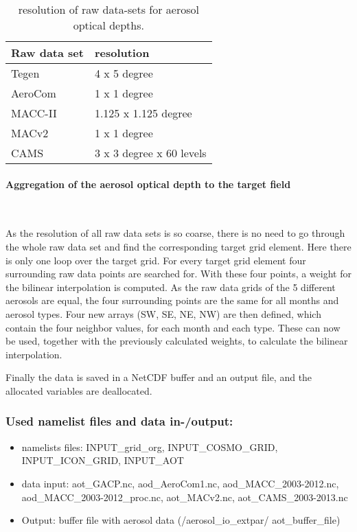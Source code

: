\documentclass[a4paper,10pt,DIV14,BCOR1cm,titlepage,twoside]{scrartcl}
\begin{document}
\begin{table}
\centering
\begin{tabular}{ll}
\textbf{Raw data set} & \textbf{resolution} \\
\hline
Tegen & 4 x 5 degree  \\
AeroCom & 1 x 1 degree  \\
MACC-II & 1.125 x 1.125 degree  \\
MACv2 & 1 x 1 degree  \\
CAMS & 3 x 3 degree x 60 levels  \\
\hline
\end{tabular}
\caption{resolution of raw data-sets for aerosol optical depths.}
\label{tab:aerosol}
\end{table}
\paragraph{Aggregation of the aerosol optical depth to the target field}\ \par\medskip\noindent
As the resolution of all raw data sets is so coarse, there is no need to go through the whole raw data set and find the corresponding target grid element. Here there is only one loop over the target grid. For every target grid element four surrounding raw data points are searched for. With these four points, a weight for the bilinear interpolation is computed. As the raw data grids of the 5 different aerosols are equal, the four surrounding points are the same for all months and aerosol types. Four new arrays (SW, SE, NE, NW) are then defined, which contain the four neighbor values, for each month and each type. These can now be used, together with the previously calculated weights, to calculate the bilinear interpolation.\par\medskip\noindent
Finally the data is saved in a NetCDF buffer and an output file, and the allocated variables are deallocated.\par\medskip\noindent
\subsubsection{Used namelist files and data in-/output:}
\begin{itemize}
\item namelists files: INPUT\_grid\_org, INPUT\_COSMO\_GRID, INPUT\_ICON\_GRID, INPUT\_AOT
 \item data input: aot\_GACP.nc, aod\_AeroCom1.nc, aod\_MACC\_2003-2012.nc, \\
     aod\_MACC\_2003-2012\_proc.nc, aot\_MACv2.nc, aot\_CAMS\_2003-2013.nc 
 \item Output: buffer file with aerosol data (/aerosol\_io\_extpar/ aot\_buffer\_file)
\end{itemize}
\end{document}
